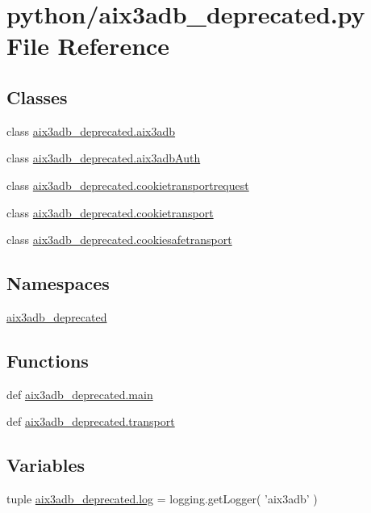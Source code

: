 \section{python/aix3adb\-\_\-deprecated.py File Reference}
\label{aix3adb__deprecated_8py}
\subsection*{Classes}
\begin{DoxyCompactItemize}
\item 
class \hyperlink{classaix3adb__deprecated_1_1aix3adb}{aix3adb\-\_\-deprecated.\-aix3adb}
\item 
class \hyperlink{classaix3adb__deprecated_1_1aix3adbAuth}{aix3adb\-\_\-deprecated.\-aix3adb\-Auth}
\item 
class \hyperlink{classaix3adb__deprecated_1_1cookietransportrequest}{aix3adb\-\_\-deprecated.\-cookietransportrequest}
\item 
class \hyperlink{classaix3adb__deprecated_1_1cookietransport}{aix3adb\-\_\-deprecated.\-cookietransport}
\item 
class \hyperlink{classaix3adb__deprecated_1_1cookiesafetransport}{aix3adb\-\_\-deprecated.\-cookiesafetransport}
\end{DoxyCompactItemize}
\subsection*{Namespaces}
\begin{DoxyCompactItemize}
\item 
\hyperlink{namespaceaix3adb__deprecated}{aix3adb\-\_\-deprecated}
\end{DoxyCompactItemize}
\subsection*{Functions}
\begin{DoxyCompactItemize}
\item 
def \hyperlink{namespaceaix3adb__deprecated_ae8c273eca20fd31b675a28e46f7bab3c}{aix3adb\-\_\-deprecated.\-main}
\item 
def \hyperlink{namespaceaix3adb__deprecated_a6ed3538701cfa12539c0d4a3f3693a5a}{aix3adb\-\_\-deprecated.\-transport}
\end{DoxyCompactItemize}
\subsection*{Variables}
\begin{DoxyCompactItemize}
\item 
tuple \hyperlink{namespaceaix3adb__deprecated_a162407c59dacc7621a5caf72adc9b362}{aix3adb\-\_\-deprecated.\-log} = logging.\-get\-Logger( 'aix3adb' )
\end{DoxyCompactItemize}

